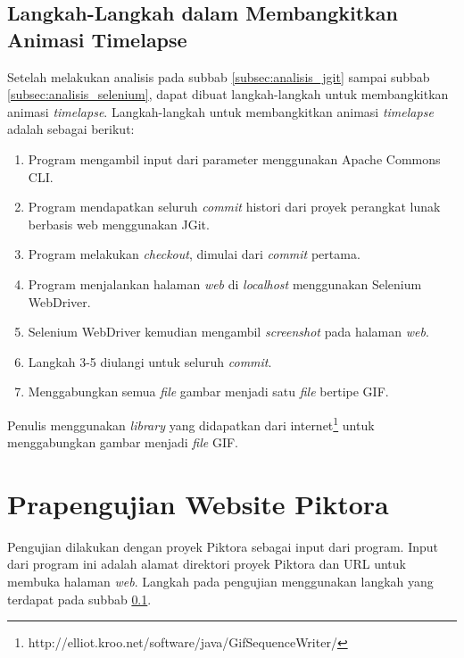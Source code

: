 \subsection{Langkah-Langkah dalam Membangkitkan Animasi Timelapse}
\label{subsec:langkah_animasi}
Setelah melakukan analisis pada subbab \ref{subsec:analisis_jgit} sampai subbab \ref{subsec:analisis_selenium}, dapat dibuat langkah-langkah untuk membangkitkan animasi \textit{timelapse}. Langkah-langkah untuk membangkitkan animasi \textit{timelapse} adalah sebagai berikut:\\
\begin{enumerate}
\item Program mengambil input dari parameter menggunakan Apache Commons CLI.
\item Program mendapatkan seluruh \textit{commit} histori dari proyek perangkat lunak berbasis web menggunakan JGit.
\item Program melakukan \textit{checkout}, dimulai dari \textit{commit} pertama.
\item Program menjalankan halaman \textit{web} di \textit{localhost} menggunakan Selenium WebDriver.
\item Selenium WebDriver kemudian mengambil \textit{screenshot} pada halaman \textit{web}.
\item Langkah 3-5 diulangi untuk seluruh \textit{commit}.
\item Menggabungkan semua \textit{file} gambar menjadi satu \textit{file} bertipe GIF.
\end{enumerate}

Penulis menggunakan \textit{library} yang didapatkan dari internet\footnote{http://elliot.kroo.net/software/java/GifSequenceWriter/} untuk menggabungkan gambar menjadi \textit{file} GIF. 

\section{Prapengujian Website Piktora}
\label{sec:prapengujian}
Pengujian dilakukan dengan proyek Piktora sebagai input dari program. Input dari program ini adalah alamat direktori proyek Piktora dan URL untuk membuka halaman \textit{web}. Langkah pada pengujian menggunakan langkah yang terdapat pada subbab \ref{subsec:langkah_animasi}.

